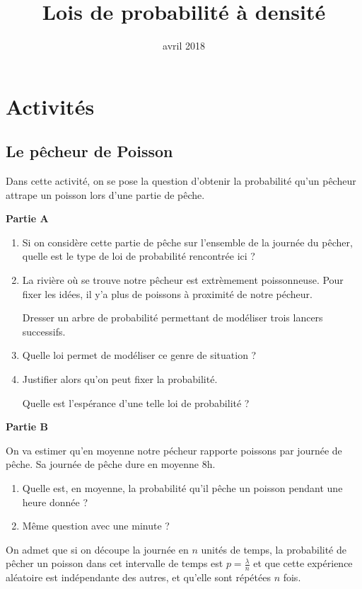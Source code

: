 \documentclass[11pt,a4paper,french]{article}
\title{Lois de probabilité à densité}
\author{\bsc{Jumel}}
\date{avril 2018}
\begin{document}
\noindent\maketitle

\bigskip

\section*{Activités}

\subsection*{Le pêcheur de Poisson}

Dans cette activité, on se pose la question d'obtenir la probabilité
qu'un pêcheur attrape un poisson lors d'une partie de pêche.

\textbf{Partie A}

\begin{enumerate}
  \item Si on considère cette partie de pêche sur l'ensemble de la
    journée du pêcher, quelle est le type de loi de probabilité
    rencontrée ici ?
  \item La rivière où se trouve notre pêcheur est extrèmement
    poissonneuse. Pour fixer les idées, il y'a plus de 
    poissons à proximité de notre pécheur.

    Dresser un arbre de probabilité permettant de modéliser trois
    lancers successifs.
  \item Quelle loi permet de modéliser ce genre de situation ?
  \item Justifier alors qu'on peut fixer la probabilité.

    Quelle est l'espérance d'une telle loi de probabilité ?
\end{enumerate}

\textbf{Partie B}

On va estimer qu'en moyenne notre pécheur rapporte  poissons par
journée de pêche. Sa journée de pêche dure en moyenne 8h.

\begin{enumerate}
  \item Quelle est, en moyenne, la probabilité qu'il pêche un poisson
    pendant une heure donnée ?
  \item Même question avec une minute ?
\end{enumerate}

On admet que si on découpe la journée en $n$ unités de temps, la
probabilité de pêcher un poisson dans cet intervalle de temps est
$p = \frac{\lambda}{n}$ et que cette expérience aléatoire est
indépendante des autres, et qu'elle sont répétées $n$ fois.
\end{document}
